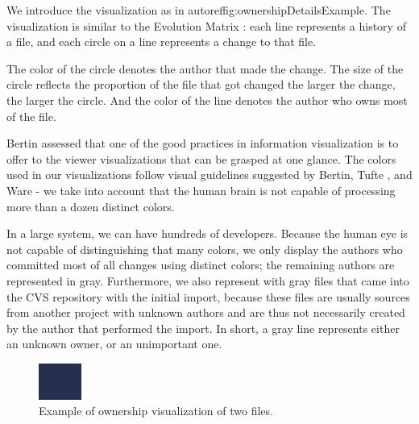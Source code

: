 We introduce the \omap visualization as in autoref{fig:ownershipDetailsExample}. The visualization is similar to the Evolution Matrix \cite{Lanz02a}: each line represents a history of a file, and each circle on a line represents a change to that file.

The color of the circle denotes the author that made the change. The size of the circle reflects the proportion of the file that got changed \ie the larger the change, the larger the circle. And the color of the line denotes the author who owns most of the file.

Bertin \cite{Bert74a} assessed that one of the good practices in information visualization is to offer to the viewer visualizations that can be grasped at one glance. The colors used in our visualizations follow visual guidelines suggested by Bertin, Tufte \cite{Tuft90a}, and Ware \cite{Ware00a} \-- \eg we take into account that the human brain is not capable of processing more than a dozen distinct colors.

In a large system, we can have hundreds of developers. Because the human eye is not capable of distinguishing that many colors, we only display the authors who committed most of all changes using distinct colors; the remaining authors are represented in gray. Furthermore, we also represent with gray files that came into the CVS repository with the initial import, because these files are usually sources from another project with unknown authors and are thus not necessarily created by the author that performed the import. In short, a gray line represents either an unknown owner, or an unimportant one.

\begin{figure}[htb]
\begin{center}
\includegraphics[width=\linewidth]{owners-map-detail}
\caption{Example of ownership visualization of two files.}
\label{fig:ownershipDetailsExample}
\end{center}
\end{figure}

